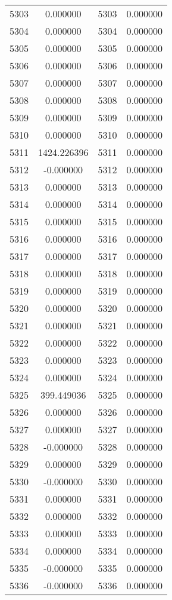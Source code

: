 \documentclass[12pt]{article}
\begin{document}
\begin{longtable}{@{}cccc@{}}
5303 & 0.000000 & 5303 & 0.000000 \\
5304 & 0.000000 & 5304 & 0.000000 \\
5305 & 0.000000 & 5305 & 0.000000 \\
5306 & 0.000000 & 5306 & 0.000000 \\
5307 & 0.000000 & 5307 & 0.000000 \\
5308 & 0.000000 & 5308 & 0.000000 \\
5309 & 0.000000 & 5309 & 0.000000 \\
5310 & 0.000000 & 5310 & 0.000000 \\
5311 & 1424.226396 & 5311 & 0.000000 \\
5312 & -0.000000 & 5312 & 0.000000 \\
5313 & 0.000000 & 5313 & 0.000000 \\
5314 & 0.000000 & 5314 & 0.000000 \\
5315 & 0.000000 & 5315 & 0.000000 \\
5316 & 0.000000 & 5316 & 0.000000 \\
5317 & 0.000000 & 5317 & 0.000000 \\
5318 & 0.000000 & 5318 & 0.000000 \\
5319 & 0.000000 & 5319 & 0.000000 \\
5320 & 0.000000 & 5320 & 0.000000 \\
5321 & 0.000000 & 5321 & 0.000000 \\
5322 & 0.000000 & 5322 & 0.000000 \\
5323 & 0.000000 & 5323 & 0.000000 \\
5324 & 0.000000 & 5324 & 0.000000 \\
5325 & 399.449036 & 5325 & 0.000000 \\
5326 & 0.000000 & 5326 & 0.000000 \\
5327 & 0.000000 & 5327 & 0.000000 \\
5328 & -0.000000 & 5328 & 0.000000 \\
5329 & 0.000000 & 5329 & 0.000000 \\
5330 & -0.000000 & 5330 & 0.000000 \\
5331 & 0.000000 & 5331 & 0.000000 \\
5332 & 0.000000 & 5332 & 0.000000 \\
5333 & 0.000000 & 5333 & 0.000000 \\
5334 & 0.000000 & 5334 & 0.000000 \\
5335 & -0.000000 & 5335 & 0.000000 \\
5336 & -0.000000 & 5336 & 0.000000 \\

\end{longtable}
\end{document}
